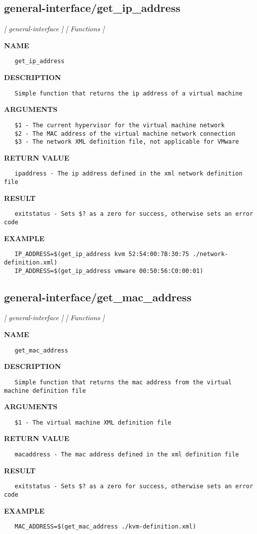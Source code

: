 \subsection{general-interface/get\_ip\_address}
\textsl{[ general-interface ]}
\textsl{[ Functions ]}

\label{ch:robo26}
\label{ch:general_interface_get_ip_address}
\textbf{NAME}
\begin{verbatim}
   get_ip_address
\end{verbatim}
\textbf{DESCRIPTION}
\begin{verbatim}
   Simple function that returns the ip address of a virtual machine
\end{verbatim}
\textbf{ARGUMENTS}
\begin{verbatim}
   $1 - The current hypervisor for the virtual machine network
   $2 - The MAC address of the virtual machine network connection
   $3 - The network XML definition file, not applicable for VMware
\end{verbatim}
\textbf{RETURN VALUE}
\begin{verbatim}
   ipaddress - The ip address defined in the xml network definition file
\end{verbatim}
\textbf{RESULT}
\begin{verbatim}
   exitstatus - Sets $? as a zero for success, otherwise sets an error code
\end{verbatim}
\textbf{EXAMPLE}
\begin{verbatim}
   IP_ADDRESS=$(get_ip_address kvm 52:54:00:7B:30:75 ./network-definition.xml)
   IP_ADDRESS=$(get_ip_address vmware 00:50:56:C0:00:01)
\end{verbatim}
\newpage
\subsection{general-interface/get\_mac\_address}
\textsl{[ general-interface ]}
\textsl{[ Functions ]}

\label{ch:robo27}
\label{ch:general_interface_get_mac_address}
\textbf{NAME}
\begin{verbatim}
   get_mac_address
\end{verbatim}
\textbf{DESCRIPTION}
\begin{verbatim}
   Simple function that returns the mac address from the virtual machine definition file
\end{verbatim}
\textbf{ARGUMENTS}
\begin{verbatim}
   $1 - The virtual machine XML definition file
\end{verbatim}
\textbf{RETURN VALUE}
\begin{verbatim}
   macaddress - The mac address defined in the xml definition file
\end{verbatim}
\textbf{RESULT}
\begin{verbatim}
   exitstatus - Sets $? as a zero for success, otherwise sets an error code
\end{verbatim}
\textbf{EXAMPLE}
\begin{verbatim}
   MAC_ADDRESS=$(get_mac_address ./kvm-definition.xml)
\end{verbatim}
\newpage
